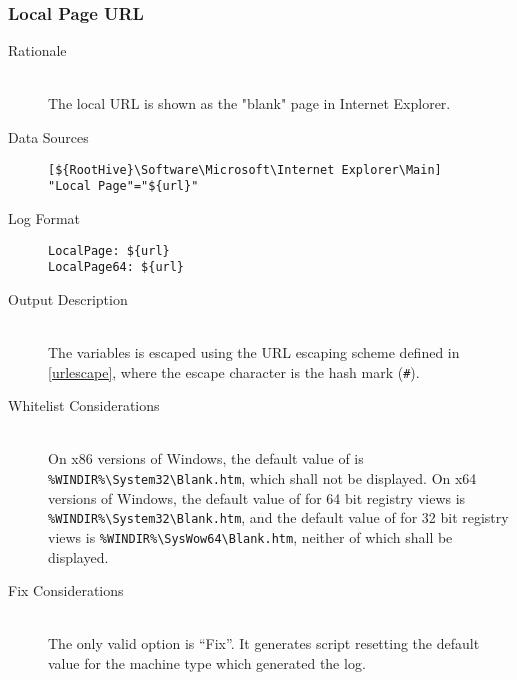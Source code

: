 \subsubsection{Local Page URL}
\begin{description}
\item[Rationale]  \hfill \\ The local URL is shown as the "blank" page in
Internet Explorer.

\item[Data Sources] \hfill
\vspace{-\baselineskip}
\begin{verbatim}
[${RootHive}\Software\Microsoft\Internet Explorer\Main]
"Local Page"="${url}"
\end{verbatim}
\item[Log Format] \hfill
\vspace{-\baselineskip}
\begin{verbatim} 
LocalPage: ${url}
LocalPage64: ${url}
\end{verbatim}
\item[Output Description] \hfill \\
The variables  is escaped using the URL escaping
scheme defined in \ref{urlescape}, where the escape character is the hash mark
(\verb|#|).
\item[Whitelist Considerations] \hfill \\
On x86 versions of Windows, the default value of
 is \verb|%WINDIR%\System32\Blank.htm|, which shall not be displayed.
On x64 versions of Windows, the default value of  for 64 bit
registry views is \verb|%WINDIR%\System32\Blank.htm|, and the default value of
 for 32 bit registry views is
\verb|%WINDIR%\SysWow64\Blank.htm|, neither of which shall be displayed.
\item[Fix Considerations] \hfill \\
The only valid option is ``Fix''. It generates script resetting the default
value for the machine type which generated the log.
\end{description}

